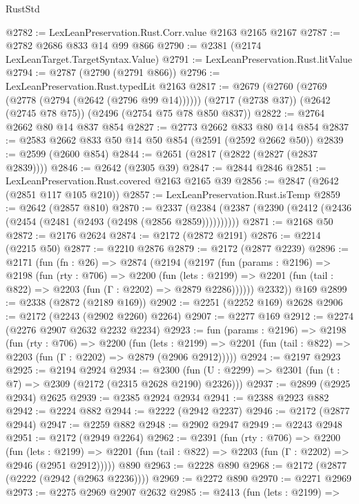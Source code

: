 \begin{lexlean}{RustStd}
\begin{coremodule}
@2782 := LexLeanPreservation.Rust.Corr.value @2163 @2165 @2167
@2787 := @2782 @2686 @833 @14 @99 @866
@2790 := @2381 (@2174 LexLeanTarget.TargetSyntax.Value)
@2791 := LexLeanPreservation.Rust.litValue
@2794 := @2787 (@2790 (@2791 @866))
@2796 := LexLeanPreservation.Rust.typedLit @2163
@2817 := @2679
    (@2760 (@2769 (@2778 (@2794 (@2642 (@2796 @99 @14))))))
    (@2717 (@2738 @37))
    (@2642 (@2745 @78 @75))
    (@2496 (@2754 @75 @78 @850 @837))
@2822 := @2764 @2662 @80 @14 @837 @854
@2827 := @2773 @2662 @833 @80 @14 @854
@2837 := @2583 @2662 @833 @50 @14 @50 @854 (@2591 (@2592 @2662 @50))
@2839 := @2599 (@2600 @854)
@2844 := @2651 (@2817 (@2822 (@2827 (@2837 @2839))))
@2846 := @2642 (@2305 @39)
@2847 := @2844 @2846
@2851 := LexLeanPreservation.Rust.covered @2163 @2165 @39
@2856 := @2847 (@2642 (@2851 @117 @105 @210))
@2857 := LexLeanPreservation.Rust.isTemp
@2859 := @2642 (@2857 @810)
@2870 := @2337 (@2384 (@2387 (@2390 (@2412 (@2436 (@2454 (@2481 (@2493 (@2498 (@2856 @2859))))))))))
@2871 := @2168 @50
@2872 := @2176 @2624
@2874 := @2172 (@2872 @2191)
@2876 := @2214 (@2215 @50)
@2877 := @2210 @2876
@2879 := @2172 (@2877 @2239)
@2896 := @2171
    (fun (fn : @26) =>
    @2874
      (@2194
        (@2197
          (fun (params : @2196) =>
          @2198
            (fun (rty : @706) =>
            @2200
              (fun (lets : @2199) =>
              @2201 (fun (tail : @822) => @2203 (fun (Γ : @2202) => @2879 @2286))))))
        @2332))
    @169
@2899 := @2338 (@2872 (@2189 @169))
@2902 := @2251 (@2252 @169) @2628
@2906 := @2172 (@2243 (@2902 @2260) @2264)
@2907 := @2277 @169
@2912 := @2274 (@2276 @2907 @2632 @2232 @2234)
@2923 := fun (params : @2196) =>
  @2198
    (fun (rty : @706) =>
    @2200
      (fun (lets : @2199) =>
      @2201 (fun (tail : @822) => @2203 (fun (Γ : @2202) => @2879 (@2906 @2912)))))
@2924 := @2197 @2923
@2925 := @2194 @2924
@2934 := @2300 (fun (U : @2299) => @2301 (fun (t : @7) => @2309 (@2172 (@2315 @2628 @2190) @2326)))
@2937 := @2899 (@2925 @2934) @2625
@2939 := @2385 @2924 @2934
@2941 := @2388 @2923 @882
@2942 := @2224 @882
@2944 := @2222 (@2942 @2237)
@2946 := @2172 (@2877 @2944)
@2947 := @2259 @882
@2948 := @2902 @2947
@2949 := @2243 @2948
@2951 := @2172 (@2949 @2264)
@2962 := @2391
    (fun (rty : @706) =>
    @2200
      (fun (lets : @2199) =>
      @2201 (fun (tail : @822) => @2203 (fun (Γ : @2202) => @2946 (@2951 @2912)))))
    @890
@2963 := @2228 @890
@2968 := @2172 (@2877 (@2222 (@2942 (@2963 @2236))))
@2969 := @2272 @890
@2970 := @2271 @2969
@2973 := @2275 @2969 @2907 @2632
@2985 := @2413
    (fun (lets : @2199) =>

\end{coremodule}
\end{lexlean}
